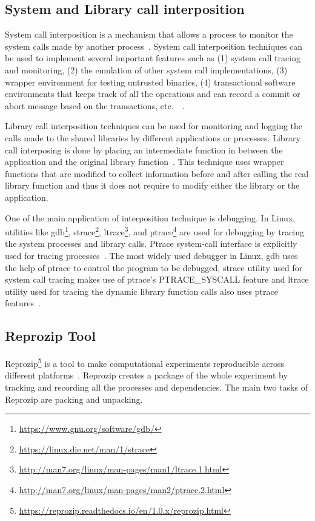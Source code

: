 \subsection{System and Library call interposition}
System call interposition is a mechanism that allows a process to monitor the system calls made by another process~\cite{Jain00user-levelinfrastructure}. System call interposition techniques can be used to implement several important features such as (1) system call tracing and monitoring, (2) the emulation of other system call implementations, (3) wrapper environment for testing untrusted binaries, (4) transactional software environments that keeps track of all the operations and can record a commit or abort message based on the transactions, etc.\ ~\cite{Jones93}.

Library call interposition techniques can be used for monitoring and logging the calls made to the shared libraries by different applications or processes. Library call interposing is done by placing an intermediate function in between the application and the original library function~\cite{Curry:1994:PTD:1267257.1267275}. This technique uses wrapper functions that are modified to collect information before and after calling the real library function and thus it does not require to modify either the library or the application.

One of the main application of interposition technique is debugging. In Linux, utilities like gdb\footnote{\url{https://www.gnu.org/software/gdb/}}, strace\footnote{\url{https://linux.die.net/man/1/strace}}, ltrace\footnote{\url{http://man7.org/linux/man-pages/man1/ltrace.1.html}}, and ptrace\footnote{\url{http://man7.org/linux/man-pages/man2/ptrace.2.html}} are used for debugging by tracing the system processes and library calls. Ptrace system-call interface is explicitly used for tracing processes~\cite{Keniston_ptrace}. The most widely used debugger in Linux, gdb uses the help of ptrace to control the program to be debugged, strace utility used for system call tracing makes use of ptrace's PTRACE\_SYSCALL feature and ltrace utility used for tracing the dynamic library function calls also uses ptrace features~\cite{Keniston_ptrace}.

\subsection{Reprozip Tool}
Reprozip\footnote{\url{https://reprozip.readthedocs.io/en/1.0.x/reprozip.html}} is a tool to make computational experiments reproducible across different platforms~\cite{Chirigati:2013:RUP:2482613.2482614}. Reprozip creates a package of the whole experiment by tracking and recording all the processes and dependencies. The main two tasks of Reprozip are packing and unpacking.

